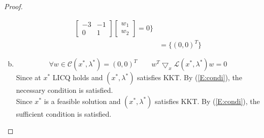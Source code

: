 \documentclass[11pt,a4paper]{article}
\renewcommand{\(}{\left(}
\renewcommand{\)}{\right)}
\begin{document}
\begin{proof}
\begin{enumerate}[(a)]
\begin{align*}
\begin{bmatrix}
  -3 & -1\\
  0 & 1
  \end{bmatrix}
  \begin{bmatrix}
  w_1\\
  w_2  
  \end{bmatrix}=0 \rbrace\\
  &=\lbrace (0,0)^T \rbrace
  \end{align*}
  \item \begin{equation}\label{E:condi}
  \forall w \in \mathcal{C}(x^\ast,\lambda^\ast)={(0,0)^T} \qquad w^T \bigtriangledown_x \mathcal{L}(x^\ast,\lambda^\ast)w=0
  \end{equation}
  Since at $x^\ast$ LICQ holds and $(x^\ast,\lambda^\ast)$ satisfies KKT. By (\ref{E:condi}), the necessary condition is satisfied.\\
  Since  $x^\ast$ is a feasible solution and $(x^\ast,\lambda^\ast)$ satisfies KKT. By (\ref{E:condi}), the sufficient condition is satisfied.
  
  \end{enumerate}
  \end{proof}
\end{document}
